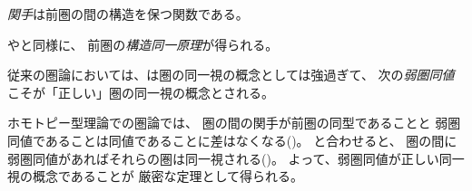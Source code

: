 \documentclass[index]{subfiles}
\begin{document}

\emph{関手}は前圏の間の構造を保つ関数である。





やと同様に、
前圏の\emph{構造同一原理}が得られる。




従来の圏論においては、は圏の同一視の概念としては強過ぎて、
次の\emph{弱圏同値}こそが「正しい」圏の同一視の概念とされる。



ホモトピー型理論での圏論では、
圏の間の関手が前圏の同型であることと
弱圏同値であることは同値であることに差はなくなる()。
と合わせると、
圏の間に弱圏同値があればそれらの圏は同一視される()。
よって、弱圏同値が正しい同一視の概念であることが
厳密な定理として得られる。








\end{document}
